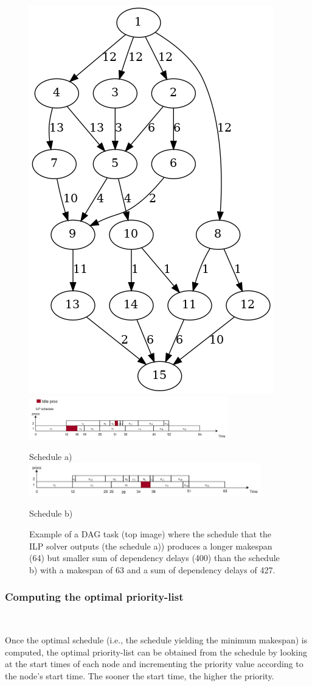 \begin{figure}
    \centering
    \includegraphics[width=0.5\linewidth]{images/Tau_108.png}
    \includegraphics[width=\linewidth, height=70px]{images/schedule_example_ilpfail_correct.png}
    \par Schedule a)
    \includegraphics[width=\linewidth, height=55px]{images/schedule_example_ilpfail_better.png}
    \par Schedule b)
    \caption{Example of a DAG task (top image) where the schedule that the ILP solver outputs (the schedule a))
    produces a longer makespan (64) but smaller sum of dependency delays (400) than 
    the schedule b) with a makespan of 63 and a sum of dependency delays of 427.}
    \label{fig:counter_example_minsumdep}
\end{figure}

\subsubsection{Computing the optimal priority-list}
~

Once the optimal schedule (i.e., the schedule yielding the minimum makespan)
is computed,
the optimal priority-list can be obtained from the schedule 
by looking at the start times of each node and incrementing the priority value
according to the node's start time.
The sooner the start time, the higher the priority.

